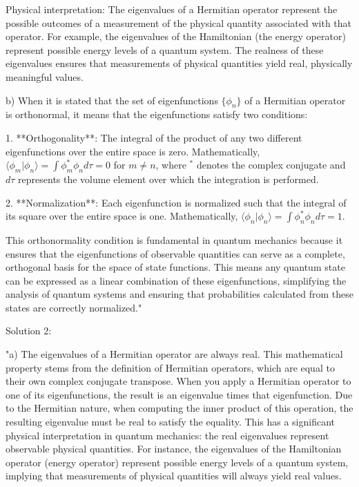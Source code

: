 Physical interpretation: The eigenvalues of a Hermitian operator represent the possible outcomes of a measurement of the physical quantity associated with that operator. For example, the eigenvalues of the Hamiltonian (the energy operator) represent possible energy levels of a quantum system. The realness of these eigenvalues ensures that measurements of physical quantities yield real, physically meaningful values.

b) When it is stated that the set of eigenfunctions \(\{\phi_{n}\}\) of a Hermitian operator is orthonormal, it means that the eigenfunctions satisfy two conditions:

1. **Orthogonality**: The integral of the product of any two different eigenfunctions over the entire space is zero. Mathematically, \(\langle \phi_{m} | \phi_{n} \rangle = \int \phi_{m}^* \phi_{n} d\tau = 0\) for \(m \neq n\), where \(^*\) denotes the complex conjugate and \(d\tau\) represents the volume element over which the integration is performed.

2. **Normalization**: Each eigenfunction is normalized such that the integral of its square over the entire space is one. Mathematically, \(\langle \phi_{n} | \phi_{n} \rangle = \int \phi_{n}^* \phi_{n} d\tau = 1\).

This orthonormality condition is fundamental in quantum mechanics because it ensures that the eigenfunctions of observable quantities can serve as a complete, orthogonal basis for the space of state functions. This means any quantum state can be expressed as a linear combination of these eigenfunctions, simplifying the analysis of quantum systems and ensuring that probabilities calculated from these states are correctly normalized."

Solution 2: 

"a) The eigenvalues of a Hermitian operator are always real. This mathematical property stems from the definition of Hermitian operators, which are equal to their own complex conjugate transpose. When you apply a Hermitian operator to one of its eigenfunctions, the result is an eigenvalue times that eigenfunction. Due to the Hermitian nature, when computing the inner product of this operation, the resulting eigenvalue must be real to satisfy the equality. This has a significant physical interpretation in quantum mechanics: the real eigenvalues represent observable physical quantities. For instance, the eigenvalues of the Hamiltonian operator (energy operator) represent possible energy levels of a quantum system, implying that measurements of physical quantities will always yield real values.

